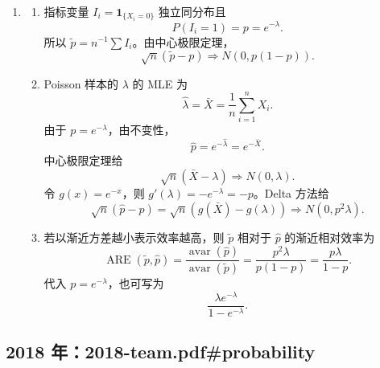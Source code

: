 \documentclass[UTF8,12pt]{ctexart}
\begin{document}
\begin{enumerate}[label=\textbf{\arabic*.},leftmargin=2.2em]
\item
\begin{enumerate}[label=\textbf{(\alph*)},leftmargin=2.4em]
\item 指标变量 \(I_i=\mathbf1_{\{X_i=0\}}\) 独立同分布且
\[
P(I_i=1)=p=e^{-\lambda}.
\]
所以 \(\widetilde p=n^{-1}\sum I_i\)。由中心极限定理，
\[
\sqrt n(\widetilde p-p)\Rightarrow N(0,p(1-p)).
\]
\item Poisson 样本的 \(\lambda\) 的 MLE 为
\[
\widehat\lambda=\bar X=\frac1n\sum_{i=1}^n X_i.
\]
由于 \(p=e^{-\lambda}\)，由不变性，
\[
\widehat p=e^{-\widehat\lambda}=e^{-\bar X}.
\]
中心极限定理给
\[
\sqrt n(\bar X-\lambda)\Rightarrow N(0,\lambda).
\]
令 \(g(x)=e^{-x}\)，则 \(g'(\lambda)=-e^{-\lambda}=-p\)。Delta 方法给
\[
\sqrt n(\widehat p-p)
=\sqrt n(g(\bar X)-g(\lambda))
\Rightarrow N(0,p^2\lambda).
\]
\item 若以渐近方差越小表示效率越高，则 \(\widetilde p\) 相对于 \(\widehat p\) 的渐近相对效率为
\[
\operatorname{ARE}(\widetilde p,\widehat p)
=\frac{\operatorname{avar}(\widehat p)}{\operatorname{avar}(\widetilde p)}
=\frac{p^2\lambda}{p(1-p)}
=\frac{p\lambda}{1-p}.
\]
代入 \(p=e^{-\lambda}\)，也可写为
\[
\frac{\lambda e^{-\lambda}}{1-e^{-\lambda}}.
\]
\end{enumerate}
\end{enumerate}


\subsection{2018 年：2018-team.pdf\#probability}
\end{document}
